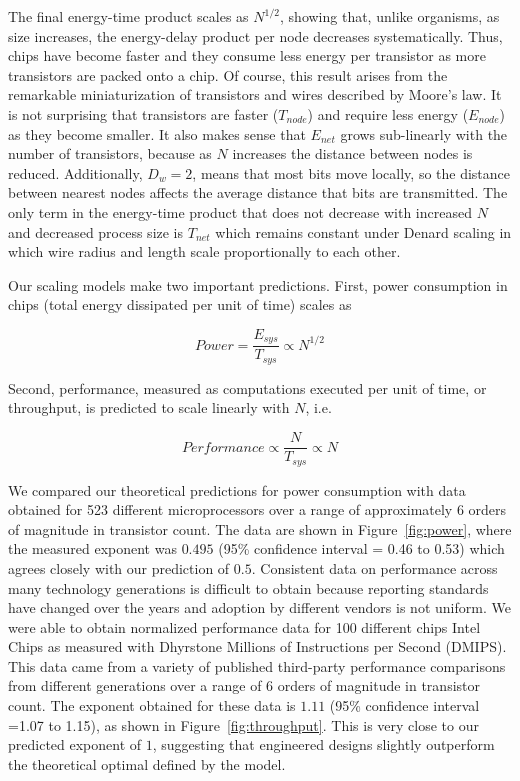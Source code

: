 \documentclass[12pt]{article}
\begin{document}
The final energy-time product scales as $N^{1/2}$, showing that, unlike
organisms, as size increases, the energy-delay product per node decreases
systematically.  Thus, chips have become faster and they consume less energy per
transistor as more transistors are packed onto a chip. Of course, this
result arises 
from the remarkable miniaturization of transistors and wires described by
Moore's law. It is not surprising that transistors are faster ($T_{node}$) and
require less energy ($E_{node}$) as they become smaller. It also makes sense
that  $E_{net}$ grows sub-linearly with the number of transistors, because as
$N$ increases the distance between nodes is reduced. Additionally, $D_w = 2$,
means that most bits move locally, so the distance between nearest nodes
affects the average distance that bits are transmitted.  The only term in the
energy-time product that does not decrease with increased $N$ and decreased
process size is $T_{net}$ which remains constant under Denard scaling in which
wire radius and length scale proportionally to each other.

Our scaling models make two important predictions.  First, power
consumption in chips (total energy dissipated per unit of time) scales as

\begin{equation}
\label{eq:Power}
Power = \frac{E_{sys}}{T_{sys}} \propto N^{1/2} 
\end{equation}
 
\noindent Second, performance,
measured as computations executed per unit of time, or throughput, is predicted
to scale linearly with $N$,  i.e.  

\begin{equation}
\label{eq:Performance}
Performance\propto \frac{N}{T_{sys}} \propto N
\end{equation}

We compared our theoretical predictions for power consumption with data obtained for 523
different microprocessors over a range of approximately 6 orders of magnitude
in transistor count.  The data are shown in Figure~\ref{fig:power}, where the
measured exponent was $0.495$ (95\% confidence interval = 0.46 to 0.53) which agrees closely with our prediction of
$0.5$. Consistent data on performance across many technology generations is
difficult to obtain because reporting standards have changed over the years and 
adoption by different vendors is not uniform.  We were able to obtain
normalized performance data for 100 different chips Intel Chips as measured
with Dhyrstone Millions of Instructions per Second (DMIPS). This data came from
a variety of published third-party performance comparisons from different
generations over a range of 6 orders of magnitude in transistor count.  The
exponent obtained for these data is $1.11$ (95\% confidence interval =1.07 to 1.15), as shown in
Figure~\ref{fig:throughput}. This is very close to our predicted exponent of
$1$, suggesting that engineered designs slightly outperform the
theoretical optimal defined by the model.  
\end{document}
